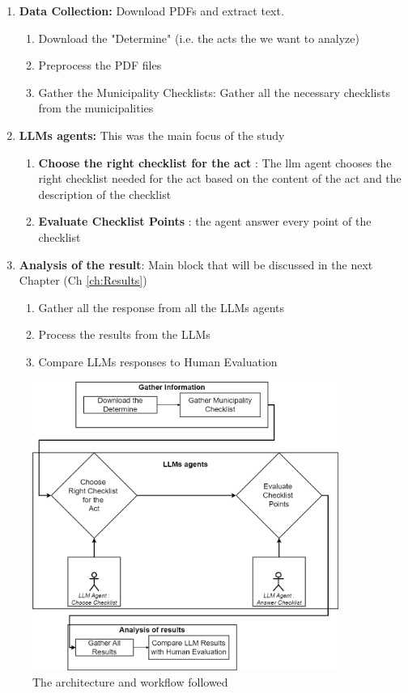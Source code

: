 \documentclass[../main.tex]{subfiles}
\begin{document}
\begin{enumerate}
    \item \textbf{Data Collection:} Download PDFs and extract text.
    \begin{enumerate}
        \item Download the "Determine" (i.e. the acts the we want to analyze) 
        \item Preprocess the PDF files
        \item Gather the Municipality Checklists: Gather all the necessary checklists from the municipalities
    \end{enumerate}
    \item \textbf{LLMs agents:} This was the main focus of the study
    \begin{enumerate}
        \item \textbf{Choose the right checklist for the act} : The llm agent chooses the right checklist needed for the act based on the content of the act and the description of the checklist
        \item \textbf{Evaluate Checklist Points} : the agent answer every point of the checklist
    \end{enumerate}
    \item \textbf{Analysis of the result}: Main block that will be discussed in the next Chapter (Ch \ref{ch:Results})
    \begin{enumerate}
        \item Gather all the response from all the LLMs agents
        \item Process the results from the LLMs
        \item Compare LLMs responses to Human Evaluation
    \end{enumerate}

\end{enumerate}

\begin{figure}[H]
    \caption{The architecture and workflow followed}
    \label{fig:workflow}
    \includegraphics[width=10cm]{Graphs/0.Workflow.png}
\end{figure}
\end{document}

